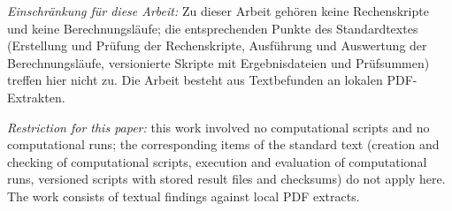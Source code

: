 \documentclass[11pt,a4paper]{article}
\theoremstyle{definition}
\begin{document}
\medskip

\noindent
\emph{Einschränkung für diese Arbeit:} Zu dieser Arbeit gehören keine
Rechenskripte und keine Berechnungsläufe; die entsprechenden Punkte des
Standardtextes (Erstellung und Prüfung der Rechenskripte, Ausführung und
Auswertung der Berechnungsläufe, versionierte Skripte mit Ergebnisdateien und
Prüfsummen) treffen hier nicht zu. Die Arbeit besteht aus Textbefunden an
lokalen PDF-Extrakten.

\medskip

\noindent
\emph{Restriction for this paper:} this work involved no computational scripts and
no computational runs; the corresponding items of the standard text (creation and
checking of computational scripts, execution and evaluation of computational runs,
versioned scripts with stored result files and checksums) do not apply here. The
work consists of textual findings against local PDF extracts.
\end{document}
